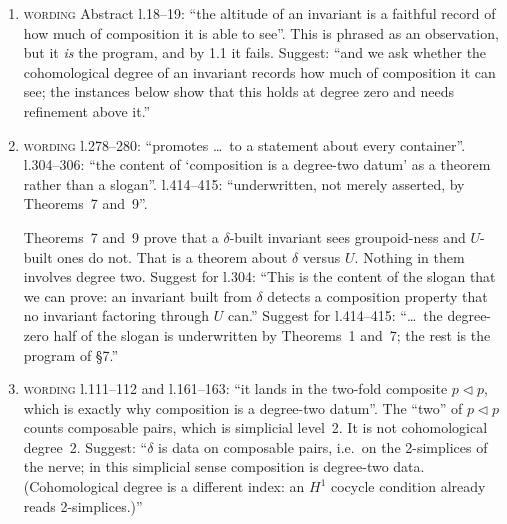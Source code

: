 \documentclass[11pt]{article}
\newcommand{\tri}{\mathbin{\triangleleft}}
\newcommand{\iss}[1]{\textsc{#1}}
\begin{document}
\begin{enumerate}[label=\textbf{1.\arabic*},leftmargin=*]
\emph{Suggested repair.} Grade by the \emph{nerve level read}, not by cohomological degree:
\begin{itemize}[leftmargin=1.2em]
\item $U(p)$ reads out-degree counts, which is below $\mathrm{sk}_1$: it has no targets;
\item $\delta$ and every $H^1(S;-)$ read $\mathrm{sk}_2$;
\item $H^2$ cocycles read $\mathrm{sk}_3$ (associativity).
\end{itemize}
Then restate the program as follows: ``an invariant factoring through $U$ (equivalently, not
reading $N_2$) is blind to composition; invariants reading $N_2$ (among them every $H^1$ of a
local system, and the $\delta$-translations) can detect it.'' Under this grading, the weld
$[\omega]\in H^2$ and inventory $[\theta_R]\in H^1$ \emph{both} read composition. They differ in
coefficients and in degree, not in whether they see composition. Theorem~4 is then the clean
statement that they are independent. Its content is unchanged; it just stops carrying the
``altitude = what it sees'' story.

\item \iss{wording} Abstract l.18--19: ``the altitude of an invariant is a faithful record of how
much of composition it is able to see''. This is phrased as an observation, but it \emph{is} the
program, and by 1.1 it fails. Suggest: ``and we ask whether the cohomological degree of an
invariant records how much of composition it can see; the instances below show that this holds at
degree zero and needs refinement above it.''

\item \iss{wording} l.278--280: ``promotes \dots\ to a statement about every container''.
l.304--306: ``the content of `composition is a degree-two datum' as a theorem rather than a
slogan''. l.414--415: ``underwritten, not merely asserted, by Theorems~7 and~9''.

Theorems~7 and~9 prove that a $\delta$-built invariant sees groupoid-ness and $U$-built ones do
not. That is a theorem about $\delta$ versus $U$. Nothing in them involves degree two. Suggest for
l.304: ``This is the content of the slogan that we can prove: an invariant built from $\delta$
detects a composition property that no invariant factoring through $U$ can.'' Suggest for
l.414--415: ``\dots\ the degree-zero half of the slogan is underwritten by Theorems~1 and~7; the
rest is the program of \S7.''

\item \iss{wording} l.111--112 and l.161--163: ``it lands in the two-fold composite $p\tri p$,
which is exactly why composition is a degree-two datum''. The ``two'' of $p\tri p$ counts
composable pairs, which is simplicial level~2. It is not cohomological degree~2. Suggest: ``$\delta$
is data on composable pairs, i.e.\ on the 2-simplices of the nerve; in this simplicial sense
composition is degree-two data. (Cohomological degree is a different index: an $H^1$ cocycle
condition already reads 2-simplices.)''
\end{enumerate}
\end{document}
